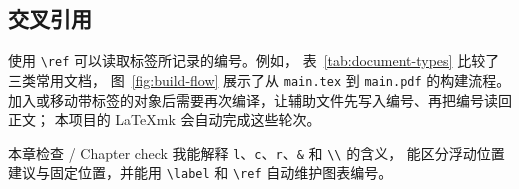 \subsection{交叉引用}

使用 \verb|\ref| 可以读取标签所记录的编号。例如，
表~\ref{tab:document-types} 比较了三类常用文档，
图~\ref{fig:build-flow} 展示了从 \texttt{main.tex} 到 \texttt{main.pdf} 的构建流程。
加入或移动带标签的对象后需要再次编译，让辅助文件先写入编号、再把编号读回正文；
本项目的 LaTeXmk 会自动完成这些轮次。

\begin{learningbox}{本章检查 / Chapter check}
我能解释 \texttt{l}、\texttt{c}、\texttt{r}、\verb|&| 和 \verb|\\| 的含义，
能区分浮动位置建议与固定位置，并能用 \verb|\label| 和 \verb|\ref| 自动维护图表编号。
\end{learningbox}
